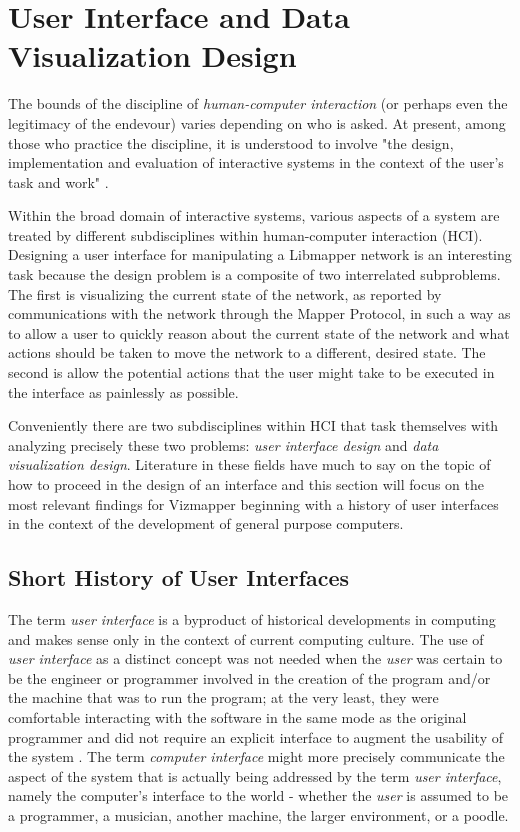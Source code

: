 \resetdatestamp

\chapter{User Interface and Data Visualization Design}

The bounds of the discipline of \emph{human-computer interaction} (or perhaps even the legitimacy of the endevour) varies depending on who is asked. At present, among those who practice the discipline, it is understood to involve "the design, implementation and evaluation of interactive systems in the context of the user's task and work" \cite{hci1998}. 

Within the broad domain of interactive systems, various aspects of a system are treated by different subdisciplines within human-computer interaction (HCI). Designing a user interface for manipulating a Libmapper network is an interesting task because the design problem is a composite of two interrelated subproblems. The first is visualizing the current state of the network, as reported by communications with the network through the Mapper Protocol, in such a way as to allow a user to quickly reason about the current state of the network and what actions should be taken to move the network to a different, desired state. The second is allow the potential actions that the user might take to be executed in the interface as painlessly as possible. 

Conveniently there are two subdisciplines within HCI that task themselves with analyzing precisely these two problems: \emph{user interface design} and \emph{data visualization design}. Literature in these fields have much to say on the topic of how to proceed in the design of an interface and this section will focus on the most relevant findings for Vizmapper beginning with a history of user interfaces in the context of the development of general purpose computers.

\section{Short History of User Interfaces}

The term \emph{user interface} is a byproduct of historical developments in computing and makes sense only in the context of current computing culture. The use of \emph{user interface} as a distinct concept was not needed when the \emph{user} was certain to be the engineer or programmer involved in the creation of the program and/or the machine that was to run the program; at the very least, they were comfortable interacting with the software in the same mode as the original programmer and did not require an explicit interface to augment the usability of the system \cite{continuity1990}. The term \emph{computer interface} might more precisely communicate the aspect of the system that is actually being addressed by the term \emph{user interface}, namely the computer's interface to the world - whether the \emph{user} is assumed to be a programmer, a musician, another machine, the larger environment, or a poodle. 

